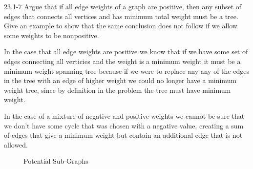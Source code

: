 \begin{problem}{23.1-7}
  Argue that if all edge weights of a graph are positive, then any subset of edges that connects all vertices and has
  minimum total weight must be a tree. Give an example to show that the same conclusion does not follow if we allow some
  weights to be nonpositive.
  \begin{solution}
    In the case that all edge weights are positive we know that if we have some set of edges connecting all verticies
    and the weight is a minimum weight it must be a minimum weight spanning tree because if we were to replace any any
    of the edges in the tree with an edge of higher weight we could no longer have a minimum weight tree, since by
    definition in the problem the tree must have minimum weight.

    In the case of a mixture of negative and positive weights we cannot be sure that we don't have some cycle that was
    chosen with a negative value, creating a sum of edges that give a minimum weight but contain an additional edge that
    is not allowed.
    \begin{figure}[H]
      \centering
      \caption{Potential Sub-Graphs}
    \end{figure}
  \end{solution}
\end{problem}

